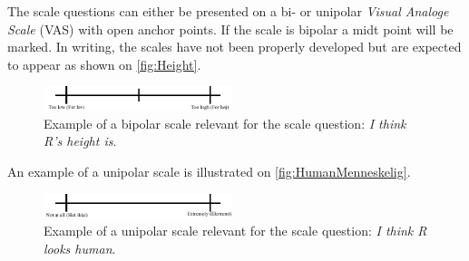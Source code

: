 %
The scale questions can either be presented on a bi- or unipolar \textit{Visual Analoge Scale} (VAS) with open anchor points. If the scale is bipolar a midt point will be marked. In writing, the scales have not been properly developed but are expected to appear as shown on \autoref{fig:Height}.
%
\begin{figure}[H]
\centering
\includegraphics[width = 0.49\textwidth]{Figure/HeightHoejde} 
\caption{Example of a bipolar scale relevant for the scale question: \textit{I think R's height is}.}
\label{fig:Height}
\end{figure}
\noindent
% 
An example of a unipolar scale is illustrated on \autoref{fig:HumanMenneskelig}.
%
\begin{figure}[H]
\centering
\includegraphics[width = 0.49\textwidth]{Figure/HumanMenneskelig} 
\caption{Example of a unipolar scale relevant for the scale question: \textit{I think R looks human}.}
\label{fig:HumanMenneskelig}
\end{figure}
\noindent
